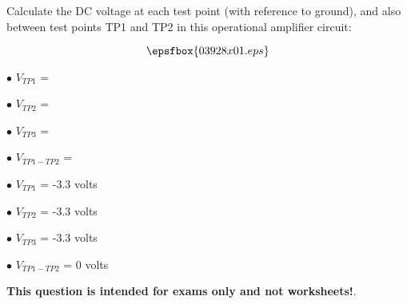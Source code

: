 

Calculate the DC voltage at each test point (with reference to ground), and also between test points TP1 and TP2 in this operational amplifier circuit:

$$\epsfbox{03928x01.eps}$$

\medskip
\item{$\bullet$} $V_{TP1}$ =
\item{$\bullet$} $V_{TP2}$ =
\item{$\bullet$} $V_{TP3}$ =
\item{$\bullet$} $V_{TP1-TP2}$ =
\medskip







\medskip
\goodbreak
\item{$\bullet$} $V_{TP1}$ = -3.3 volts
\item{$\bullet$} $V_{TP2}$ = -3.3 volts
\item{$\bullet$} $V_{TP3}$ = -3.3 volts
\item{$\bullet$} $V_{TP1-TP2}$ = 0 volts
\medskip







{\bf This question is intended for exams only and not worksheets!}.



